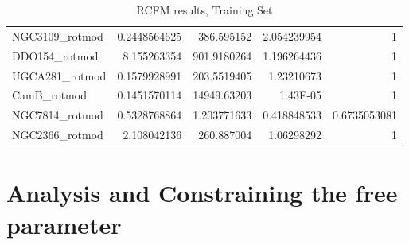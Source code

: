 \documentclass[reprint,%
 amsmath,amssymb,
 aps,
]{revtex4-1}
\begin{document}
\begin{table}[]
\begin{tabular}{|l|r|r|r|r|}
NGC3109\_rotmod        & 0.2448564625                                            & 386.595152                                        & 2.054239954                                             & 1                                                        \\
DDO154\_rotmod         & 8.155263354                                             & 901.9180264                                       & 1.196264436                                             & 1                                                        \\
UGCA281\_rotmod        & 0.1579928991                                            & 203.5519405                                       & 1.23210673                                              & 1                                                        \\
CamB\_rotmod           & 0.1451570114                                            & 14949.63203                                       & 1.43E-05                                                & 1                                                        \\
NGC7814\_rotmod        & 0.5328768864                                            & 1.203771633                                       & 0.418848533                                             & 0.6735053081                                             \\
NGC2366\_rotmod        & 2.108042136                                             & 260.887004                                        & 1.06298292                                              & 1                                                        \\
\end{tabular}
 \hline \hline
  \caption{RCFM results, Training Set
      }
   \label{tab:Tset2}
\hline
\end{table}
 
\section{Analysis and Constraining the free parameter \label{sec:analysis}}
 
\end{document}
